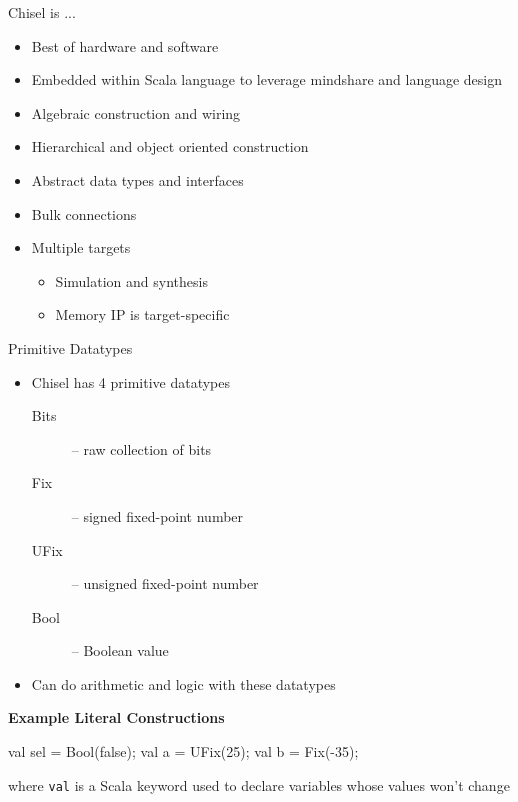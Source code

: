 \documentclass[xcolor=pdflatex,dvipsnames,table]{beamer}
\begin{document}
\begin{frame}[fragile]{Chisel is ...}
\begin{itemize}
\item Best of hardware and software
\item Embedded within Scala language to leverage mindshare and language design
\item Algebraic construction and wiring
\item Hierarchical and object oriented construction
\item Abstract data types and interfaces
\item Bulk connections
\item Multiple targets
\begin{itemize}
\item Simulation and synthesis
\item Memory IP is target-specific
\end{itemize}
\end{itemize}
\end{frame}

\begin{frame}[fragile]{Primitive Datatypes}
\begin{itemize}
\item{Chisel has 4 primitive datatypes}
\begin{description}
\item[Bits]  -- raw collection of bits
\item[Fix]   -- signed fixed-point number
\item[UFix] -- unsigned fixed-point number
\item[Bool] -- Boolean value
\end{description}
\item Can do arithmetic and logic with these datatypes
\end{itemize}

\textbf{Example Literal Constructions}
\begin{scala}
val sel = Bool(false);
val a   = UFix(25);
val b   = Fix(-35);
\end{scala}
where \verb+val+ is a Scala keyword used to declare variables whose values won't change
\end{frame}
\end{document}
